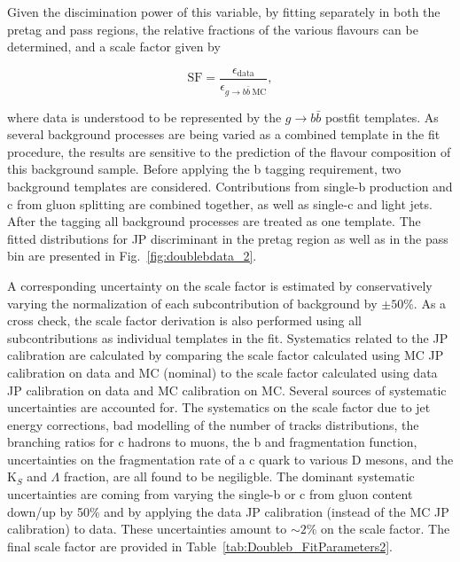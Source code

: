 Given the discimination power of this variable, by fitting separately in both the pretag and pass regions, the relative fractions of the various flavours can be determined, and a scale factor given by 

\begin{equation}
\text{SF}=\frac{\epsilon_{\text{data}}}{\epsilon_{g\to b\bar{b}~\text{MC}}},
\end{equation}

where data is understood to be represented by the $g\to b\bar{b}$ postfit templates.
As several background processes are being varied as a combined template in the fit procedure, the results are sensitive to the prediction of the flavour composition of this background sample. Before applying the b tagging requirement, two background templates are considered. Contributions from single-b production and c from gluon splitting are combined together, as well as single-c and light jets. After the tagging all background processes are treated as one template. The fitted distributions for JP discriminant in the pretag region as well as in the pass bin are presented in Fig.~\ref{fig:doublebdata_2}. 

A corresponding uncertainty on the scale factor is estimated by conservatively varying the normalization of each subcontribution of background by $\pm 50\%$. As a cross check, the scale factor derivation is also performed using all subcontributions as individual templates in the fit. Systematics related to the JP calibration are calculated by comparing the scale factor calculated using MC JP calibration on data and MC (nominal) to the scale factor calculated using data JP calibration on data and MC calibration on MC. Several sources of systematic uncertainties are accounted for. The systematics on the scale factor due to jet energy corrections, bad modelling of the number of tracks distributions, the branching ratios for c hadrons to muons, the b and fragmentation function, uncertainties on the fragmentation rate of a c quark to various D mesons, and the K$_S$ and $\Lambda$ fraction, are all found to be negiligble. The dominant systematic uncertainties are coming from varying the single-b or c from gluon content down/up by 50\% and by applying the data JP calibration (instead of the MC JP calibration) to data. These uncertainties amount to $\sim2\%$ on the scale factor. The final scale factor are provided in Table~\ref{tab:Doubleb_FitParameters2}.





